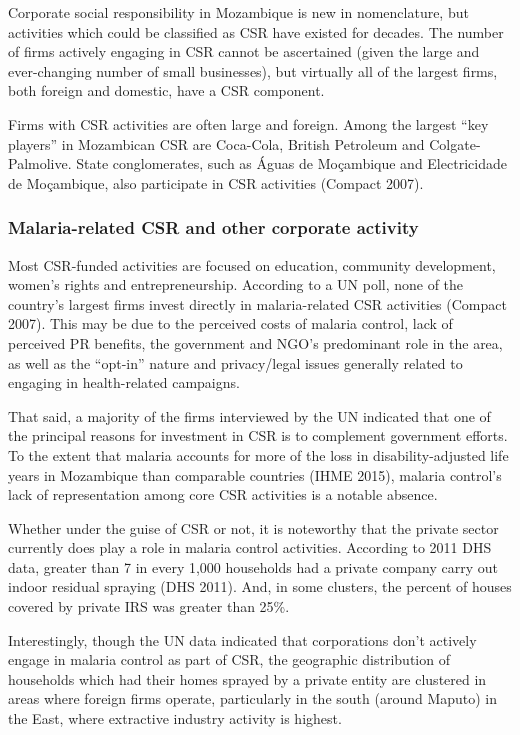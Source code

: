 \documentclass[]{elsarticle} %
\begin{document}
Corporate social responsibility in Mozambique is new in nomenclature,
but activities which could be classified as CSR have existed for
decades. The number of firms actively engaging in CSR cannot be
ascertained (given the large and ever-changing number of small
businesses), but virtually all of the largest firms, both foreign and
domestic, have a CSR component.

Firms with CSR activities are often large and foreign. Among the largest
``key players'' in Mozambican CSR are Coca-Cola, British Petroleum and
Colgate-Palmolive. State conglomerates, such as Águas de Moçambique and
Electricidade de Moçambique, also participate in CSR activities (Compact
2007).

\subsubsection{Malaria-related CSR and other corporate
activity}\label{malaria-related-csr-and-other-corporate-activity}

Most CSR-funded activities are focused on education, community
development, women's rights and entrepreneurship. According to a UN
poll, none of the country's largest firms invest directly in
malaria-related CSR activities (Compact 2007). This may be due to the
perceived costs of malaria control, lack of perceived PR benefits, the
government and NGO's predominant role in the area, as well as the
``opt-in'' nature and privacy/legal issues generally related to engaging
in health-related campaigns.

That said, a majority of the firms interviewed by the UN indicated that
one of the principal reasons for investment in CSR is to complement
government efforts. To the extent that malaria accounts for more of the
loss in disability-adjusted life years in Mozambique than comparable
countries (IHME 2015), malaria control's lack of representation among
core CSR activities is a notable absence.

Whether under the guise of CSR or not, it is noteworthy that the private
sector currently does play a role in malaria control activities.
According to 2011 DHS data, greater than 7 in every 1,000 households had
a private company carry out indoor residual spraying (DHS 2011). And, in
some clusters, the percent of houses covered by private IRS was greater
than 25\%.

Interestingly, though the UN data indicated that corporations don't
actively engage in malaria control as part of CSR, the geographic
distribution of households which had their homes sprayed by a private
entity are clustered in areas where foreign firms operate, particularly
in the south (around Maputo) in the East, where extractive industry
activity is highest.
\end{document}
